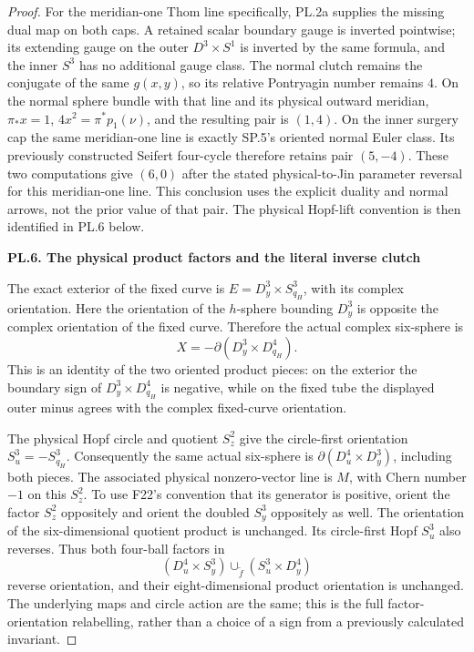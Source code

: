 \begin{proof}
For the meridian-one Thom line specifically, PL.2a supplies the missing
dual map on both caps. A retained scalar boundary gauge is inverted
pointwise; its extending gauge on the outer \(D^3\times S^1\) is
inverted by the same formula, and the inner \(S^3\) has no additional
gauge class. The normal clutch remains the conjugate of the same
\(g(x,y)\), so its relative Pontryagin number remains \(4\). On the
normal sphere bundle with that line and its physical outward meridian,
\(\pi_*x=1\), \(4x^2=\pi^*p_1(\nu)\), and the resulting pair is
\((1,4)\). On the inner surgery cap the same meridian-one line is
exactly SP.5's oriented normal Euler class. Its previously constructed
Seifert four-cycle therefore retains pair \((5,-4)\). These two
computations give \((6,0)\) after the stated physical-to-Jin parameter
reversal for this meridian-one line. This conclusion uses the explicit
duality and normal arrows, not the prior value of that pair. The physical Hopf-lift convention is then identified in PL.6 below.

\par

\medskip\noindent\textbf{PL.6. The physical product factors and the literal inverse clutch}

\par\nopagebreak[4]

The exact exterior of the fixed curve is
\(E=D^3_y\times S^3_{q_H}\), with its complex orientation. Here the
orientation of the \(h\)-sphere bounding \(D^3_y\) is opposite the
complex orientation of the fixed curve. Therefore the actual complex
six-sphere is
\[
 X=-\partial(D^3_y\times D^4_{q_H}).
\]
This is an identity of the two oriented product pieces: on the exterior
the boundary sign of \(D^3_y\times D^4_{q_H}\) is negative, while on
the fixed tube the displayed outer minus agrees with the complex
fixed-curve orientation.

The physical Hopf circle and quotient \(S^2_z\) give the circle-first
orientation \(S^3_u=-S^3_{q_H}\). Consequently the same actual
six-sphere is \(\partial(D^4_u\times D^3_y)\), including both pieces.
The associated physical nonzero-vector line is \(M\), with Chern
number \(-1\) on this \(S^2_z\). To use F22's convention that its
generator is positive, orient the factor \(S^2_z\) oppositely and
orient the doubled \(S^3_y\) oppositely as well. The orientation of
the six-dimensional quotient product is unchanged. Its circle-first
Hopf \(S^3_u\) also reverses. Thus both four-ball factors in
\[
 (D^4_u\times S^3_y)\cup_{\widetilde f}
                      (S^3_u\times D^4_y)
\]
reverse orientation, and their eight-dimensional product orientation
is unchanged. The underlying maps and circle action are the same;
this is the full factor-orientation relabelling, rather than a choice
of a sign from a previously calculated invariant.


\end{proof}
